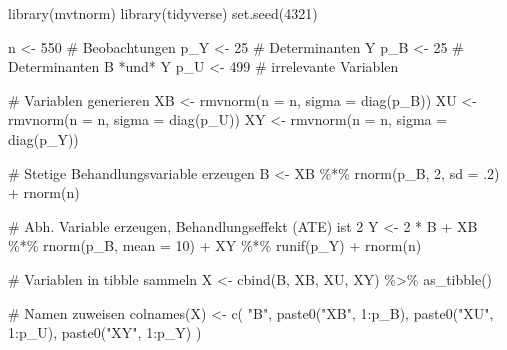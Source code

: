 \documentclass[
  a4paper,
  DIV=11,
  oneside]{scrreprt}
\newenvironment{Shaded}{\begin{snugshade}}{\end{snugshade}}
\newcommand{\AttributeTok}[1]{\textcolor[rgb]{0.40,0.45,0.13}{#1}}
\newcommand{\CommentTok}[1]{\textcolor[rgb]{0.37,0.37,0.37}{#1}}
\newcommand{\DecValTok}[1]{\textcolor[rgb]{0.68,0.00,0.00}{#1}}
\newcommand{\FunctionTok}[1]{\textcolor[rgb]{0.28,0.35,0.67}{#1}}
\newcommand{\NormalTok}[1]{\textcolor[rgb]{0.00,0.23,0.31}{#1}}
\newcommand{\OtherTok}[1]{\textcolor[rgb]{0.00,0.23,0.31}{#1}}
\newcommand{\SpecialCharTok}[1]{\textcolor[rgb]{0.37,0.37,0.37}{#1}}
\newcommand{\StringTok}[1]{\textcolor[rgb]{0.13,0.47,0.30}{#1}}
\begin{document}
\begin{Shaded}
\begin{Highlighting}[]
\FunctionTok{library}\NormalTok{(mvtnorm)}
\FunctionTok{library}\NormalTok{(tidyverse)}
\FunctionTok{set.seed}\NormalTok{(}\DecValTok{4321}\NormalTok{)}

\NormalTok{n }\OtherTok{\textless{}{-}} \DecValTok{550}      \CommentTok{\# Beobachtungen}
\NormalTok{p\_Y }\OtherTok{\textless{}{-}} \DecValTok{25}     \CommentTok{\# Determinanten Y}
\NormalTok{p\_B }\OtherTok{\textless{}{-}} \DecValTok{25}     \CommentTok{\# Determinanten B *und* Y}
\NormalTok{p\_U }\OtherTok{\textless{}{-}} \DecValTok{499}    \CommentTok{\# irrelevante Variablen }

\CommentTok{\# Variablen generieren}
\NormalTok{XB }\OtherTok{\textless{}{-}} \FunctionTok{rmvnorm}\NormalTok{(}\AttributeTok{n =}\NormalTok{ n, }\AttributeTok{sigma =} \FunctionTok{diag}\NormalTok{(p\_B))}
\NormalTok{XU }\OtherTok{\textless{}{-}} \FunctionTok{rmvnorm}\NormalTok{(}\AttributeTok{n =}\NormalTok{ n, }\AttributeTok{sigma =} \FunctionTok{diag}\NormalTok{(p\_U))}
\NormalTok{XY }\OtherTok{\textless{}{-}} \FunctionTok{rmvnorm}\NormalTok{(}\AttributeTok{n =}\NormalTok{ n, }\AttributeTok{sigma =} \FunctionTok{diag}\NormalTok{(p\_Y))}

\CommentTok{\# Stetige Behandlungsvariable erzeugen}
\NormalTok{B }\OtherTok{\textless{}{-}}\NormalTok{ XB }\SpecialCharTok{\%*\%} \FunctionTok{rnorm}\NormalTok{(p\_B, }\DecValTok{2}\NormalTok{, }\AttributeTok{sd =}\NormalTok{ .}\DecValTok{2}\NormalTok{) }\SpecialCharTok{+} \FunctionTok{rnorm}\NormalTok{(n)}

\CommentTok{\# Abh. Variable erzeugen, Behandlungseffekt (ATE) ist 2}
\NormalTok{Y }\OtherTok{\textless{}{-}} \DecValTok{2} \SpecialCharTok{*}\NormalTok{ B }\SpecialCharTok{+} 
\NormalTok{  XB }\SpecialCharTok{\%*\%} \FunctionTok{rnorm}\NormalTok{(p\_B, }\AttributeTok{mean =} \DecValTok{10}\NormalTok{) }\SpecialCharTok{+} 
\NormalTok{  XY }\SpecialCharTok{\%*\%} \FunctionTok{runif}\NormalTok{(p\_Y) }\SpecialCharTok{+} 
  \FunctionTok{rnorm}\NormalTok{(n)}

\CommentTok{\# Variablen in tibble sammeln}
\NormalTok{X }\OtherTok{\textless{}{-}} \FunctionTok{cbind}\NormalTok{(B, XB, XU, XY) }\SpecialCharTok{\%\textgreater{}\%} 
  \FunctionTok{as\_tibble}\NormalTok{()}

\CommentTok{\# Namen zuweisen}
\FunctionTok{colnames}\NormalTok{(X) }\OtherTok{\textless{}{-}} \FunctionTok{c}\NormalTok{(}
  \StringTok{"B"}\NormalTok{, }
  \FunctionTok{paste0}\NormalTok{(}\StringTok{"XB"}\NormalTok{, }\DecValTok{1}\SpecialCharTok{:}\NormalTok{p\_B), }
  \FunctionTok{paste0}\NormalTok{(}\StringTok{"XU"}\NormalTok{, }\DecValTok{1}\SpecialCharTok{:}\NormalTok{p\_U),}
  \FunctionTok{paste0}\NormalTok{(}\StringTok{"XY"}\NormalTok{, }\DecValTok{1}\SpecialCharTok{:}\NormalTok{p\_Y) }
\NormalTok{)}
\end{Highlighting}
\end{Shaded}
\end{document}

